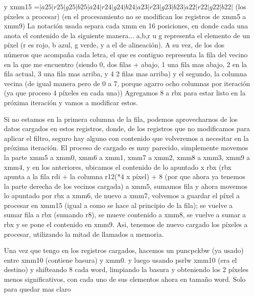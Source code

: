 \documentclass[a4paper]{article}
\begin{document}
y xmm15 =$|a25|r25|g25|b25|a24|r24|g24|b24|a23|r23|g23|b23|a22|r22|g22|b22|$
\hfill \break 
(los píxeles a procesar) (en el procesamiento no se modifican los registros de xmm5 a xmm9) \hfill \break
La notación usada separa cada xmm en 16 posiciones, en donde cada una anota el contenido de la siguiente manera... a,b,r u g representa el elemento de un píxel (r es rojo, b azul, g verde, y a el de alineación). A su vez, de los dos números que acompaña cada letra, el que es contiguo representa la fila del vecino en la que me encuentro (siendo 0, dos filas + abajo, 1 una fila mas abajo, 2 en la fila actual, 3 una fila mas arriba, y 4 2 filas mas arriba) y  el segundo, la columna vecina (de igual manera pero de 0 a 7, porque agarro ocho columnas por iteración (ya que proceso 4 píxeles en cada una))
\hfill \break
        Agregamos 8 a rbx para estar listo en la próxima iteración y vamos a modificar estos.\hfill \break
        
        Si no estamos en la primera columna de la fila, podemos aprovecharnos de los datos cargados en estos registros, donde, de los registros que no modificamos para aplicar el filtro, seguro hay alguno con contenido que volveremos a necesitar en la próxima iteración. El proceso de cargado es muy parecido, simplemente movemos la parte  xmm5 a xmm0, xmm6 a xmm1, xmm7 a xmm2, xmm8 a xmm3, xmm9 a xmm4, y en los anteriores, ubicamos el contenido de lo apuntado x rbx \hfill \break
        (rbx apunta a la fila rdi + la columna r12(*4 x píxel) + 8 (por que ahora ya tenemos la parte derecha de los vecinos cargada) a xmm5, sumamos fila y ahora movemos lo apuntado por rbx a xmm6, de nuevo a xmm7, volvemos a guardar el píxel a procesar en xmm15 (igual a como se hace al principio de la fila); se vuelve a sumar fila a rbx (sumando r8), se mueve contenido a xmm8, se vuelve a sumar a rbx y se pone el contenido en xmm9.\hfill \break
        Asi, tenemos de nuevo cargado los píxeles a procesar, utilizando la mitad de llamados a memoria. \hfill \break
        
        Una vez que tengo en los registros cargados, hacemos un puncpckbw (ya usado) entre xmm10 (contiene basura) y xmm0. y luego usando psrlw xmm10 (era el destino) y shifteando 8 cada word, limpiando la basura  y obteniendo los 2 píxeles menos significativos, con cada uno de sus elementos ahora en tamaño word.\hfill \break
        Solo para quedar mas claro
        \hfill \break
        
\end{document}
